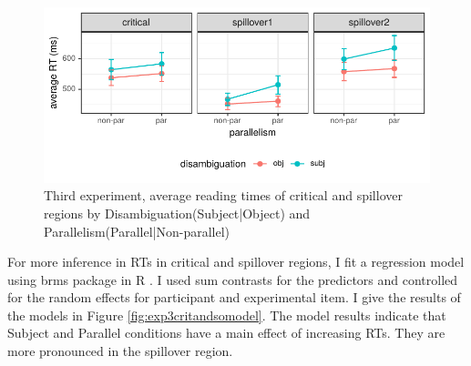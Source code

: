 \begin{knitrout}
\color{fgcolor}\begin{figure}[hbt!]

{\centering \includegraphics[]{experiments/equivalance/report/figure/exp3critandso-1.pdf} 

}

\caption[Third experiment, average reading times of critical and spillover regions by Disambiguation(Subject|Object) and Parallelism(Parallel|Non-parallel)]{Third experiment, average reading times of critical and spillover regions by Disambiguation(Subject|Object) and Parallelism(Parallel|Non-parallel)}\label{fig:exp3critandso}
\end{figure}


\end{knitrout}

For more inference in RTs in critical and spillover regions, I fit a regression model using brms package in R \citep{burkner2017brms}. I used sum contrasts for the predictors and controlled for the random effects for participant and experimental item. I give the results of the models in Figure \ref{fig:exp3critandsomodel}. The model results indicate that Subject and Parallel conditions have a main effect of increasing RTs. They are more pronounced in the spillover region.

